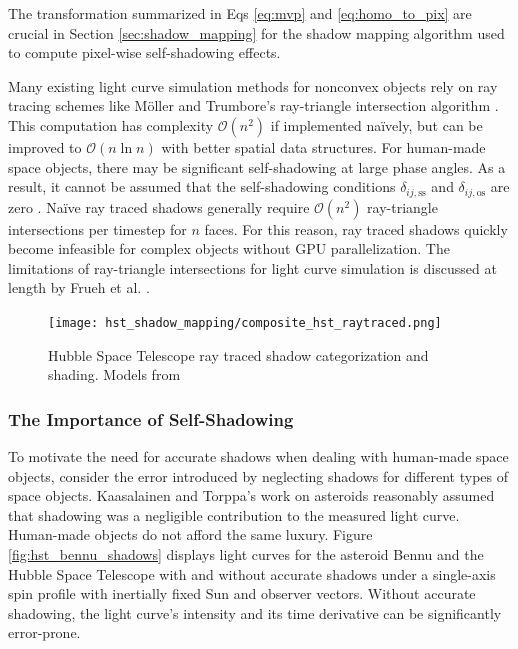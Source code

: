 The transformation summarized in Eqs \ref{eq:mvp} and \ref{eq:homo_to_pix} are crucial in Section \ref{sec:shadow_mapping} for the shadow mapping algorithm used to compute pixel-wise self-shadowing effects.

Many existing light curve simulation methods for nonconvex objects rely on ray tracing schemes like Möller and Trumbore's ray-triangle intersection algorithm \cite{moller2005,fan2020thesis}. This computation has complexity $\mathcal{O}(n^2)$ if implemented naïvely, but can be improved to $\mathcal{O}(n \ln n)$ with better spatial data structures. For human-made space objects, there may be significant self-shadowing at large phase angles. As a result, it cannot be assumed that the self-shadowing conditions $\delta_{ij,\text{ss}}$ and $\delta_{ij,\text{os}}$ are zero \cite{frueh2014,fan2020thesis}. Naïve ray traced shadows generally require $\mathcal{O}(n^2)$ ray-triangle intersections per timestep for $n$ faces. For this reason, ray traced shadows quickly become infeasible for complex objects without GPU parallelization. The limitations of ray-triangle intersections for light curve simulation is discussed at length by Frueh et al. \cite{frueh2014}.

\graphicspath{{/Users/liamrobinson/Documents/msthesis/static_images/aas_2022_figs}}
\begin{figure}[!htb]
  \centering
  \texttt{[image: hst\_shadow\_mapping/composite\_hst\_raytraced.png]}
  \caption{Hubble Space Telescope ray traced shadow categorization and shading. Models from \cite{nasa_models}}
  \label{hst_shadows_ray}
\end{figure}

\subsubsection{The Importance of Self-Shadowing}

To motivate the need for accurate shadows when dealing with human-made space objects, consider the error introduced by neglecting shadows for different types of space objects. Kaasalainen and Torppa's work on asteroids reasonably assumed that shadowing was a negligible contribution to the measured light curve. Human-made objects do not afford the same luxury. Figure \ref{fig:hst_bennu_shadows} displays light curves for the asteroid Bennu and the Hubble Space Telescope with and without accurate shadows under a single-axis spin profile with inertially fixed Sun and observer vectors. Without accurate shadowing, the light curve's intensity and its time derivative can be significantly error-prone.

